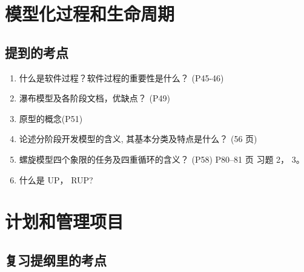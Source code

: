 \documentclass[14pt, letterpaper, UTF8, fontset=windowsnew, heading=true]{article}
\begin{document}
\section{模型化过程和生命周期}

\subsection{提到的考点}

\begin{enumerate}
	\item 什么是软件过程？软件过程的重要性是什么？ (P45-46)
	\item 瀑布模型及各阶段文档，优缺点？ (P49)
	\item 原型的概念(P51)
	\item 论述分阶段开发模型的含义, 其基本分类及特点是什么？ (56 页)
	\item 螺旋模型四个象限的任务及四重循环的含义？ (P58) P80--81 页 习题 2， 3。
	\item 什么是 UP， RUP?
\end{enumerate}


\section{计划和管理项目}

\subsection{复习提纲里的考点}
\end{document}
